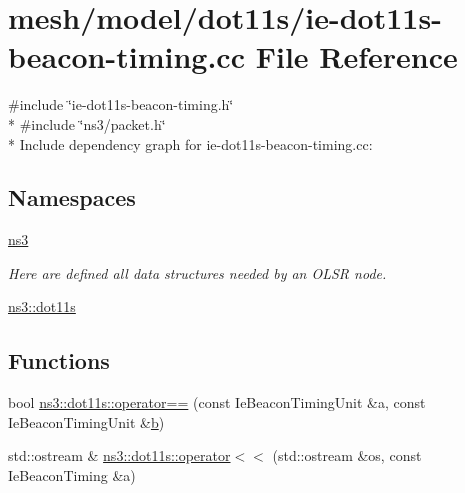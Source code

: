 \hypertarget{ie-dot11s-beacon-timing_8cc}{}\section{mesh/model/dot11s/ie-\/dot11s-\/beacon-\/timing.cc File Reference}
\label{ie-dot11s-beacon-timing_8cc}
{\ttfamily \#include \char`\"{}ie-\/dot11s-\/beacon-\/timing.\+h\char`\"{}}\\*
{\ttfamily \#include \char`\"{}ns3/packet.\+h\char`\"{}}\\*
Include dependency graph for ie-\/dot11s-\/beacon-\/timing.cc\+:
\subsection*{Namespaces}
\begin{DoxyCompactItemize}
\item 
 \hyperlink{namespacens3}{ns3}
\begin{DoxyCompactList}\small\item\em Here are defined all data structures needed by an O\+L\+SR node. \end{DoxyCompactList}\item 
 \hyperlink{namespacens3_1_1dot11s}{ns3\+::dot11s}
\end{DoxyCompactItemize}
\subsection*{Functions}
\begin{DoxyCompactItemize}
\item 
bool \hyperlink{namespacens3_1_1dot11s_aea4d921c21dfcbe118a0025929c97465}{ns3\+::dot11s\+::operator==} (const Ie\+Beacon\+Timing\+Unit \&a, const Ie\+Beacon\+Timing\+Unit \&\hyperlink{lte__pathloss_8m_a21ad0bd836b90d08f4cf640b4c298e7c}{b})
\item 
std\+::ostream \& \hyperlink{namespacens3_1_1dot11s_ae0278b579c45cfe5ad549d86be2f115d}{ns3\+::dot11s\+::operator$<$$<$} (std\+::ostream \&os, const Ie\+Beacon\+Timing \&a)
\end{DoxyCompactItemize}
